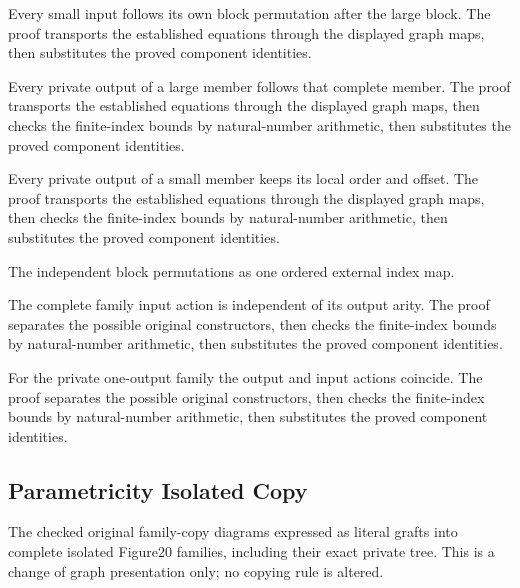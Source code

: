 Every small input follows its own block permutation after the large block.
The proof transports the established equations through the displayed graph maps, then substitutes the proved component identities.
\par{}

Every private output of a large member follows that complete member.
The proof transports the established equations through the displayed graph maps, then checks the finite-index bounds by natural-number arithmetic, then substitutes the proved component identities.
\par{}

Every private output of a small member keeps its local order and offset.
The proof transports the established equations through the displayed graph maps, then checks the finite-index bounds by natural-number arithmetic, then substitutes the proved component identities.
\par{}

The independent block permutations as one ordered external index map.
\par{}

The complete family input action is independent of its output arity.
The proof separates the possible original constructors, then checks the finite-index bounds by natural-number arithmetic, then substitutes the proved component identities.
\par{}

For the private one-output family the output and input actions coincide.
The proof separates the possible original constructors, then checks the finite-index bounds by natural-number arithmetic, then substitutes the proved component identities.
\par{}

\subsection{Parametricity Isolated Copy}
The checked original family-copy diagrams expressed as literal grafts
into complete isolated Figure20 families, including their exact private tree.
This is a change of graph presentation only; no copying rule is altered.

